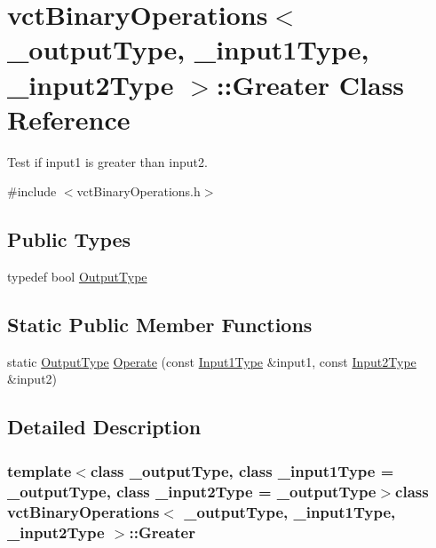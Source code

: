 \hypertarget{classvct_binary_operations_1_1_greater}{\section{vct\-Binary\-Operations$<$ \-\_\-output\-Type, \-\_\-input1\-Type, \-\_\-input2\-Type $>$\-:\-:Greater Class Reference}
\label{classvct_binary_operations_1_1_greater}
}


Test if input1 is greater than input2.  




{\ttfamily \#include $<$vct\-Binary\-Operations.\-h$>$}

\subsection*{Public Types}
\begin{DoxyCompactItemize}
\item 
typedef bool \hyperlink{classvct_binary_operations_1_1_greater_ac6bbb1b038cdd55bc5fda5b024404ebe}{Output\-Type}
\end{DoxyCompactItemize}
\subsection*{Static Public Member Functions}
\begin{DoxyCompactItemize}
\item 
static \hyperlink{classvct_binary_operations_1_1_greater_ac6bbb1b038cdd55bc5fda5b024404ebe}{Output\-Type} \hyperlink{classvct_binary_operations_1_1_greater_ab901e65f312b9e551df7b57a25e3503d}{Operate} (const \hyperlink{classvct_binary_operations_a5e56a66a012d6a28c539a08a0021c45e}{Input1\-Type} \&input1, const \hyperlink{classvct_binary_operations_a929119af557a04a16b4d854981e49e1b}{Input2\-Type} \&input2)
\end{DoxyCompactItemize}


\subsection{Detailed Description}
\subsubsection*{template$<$class \-\_\-output\-Type, class \-\_\-input1\-Type = \-\_\-output\-Type, class \-\_\-input2\-Type = \-\_\-output\-Type$>$class vct\-Binary\-Operations$<$ \-\_\-output\-Type, \-\_\-input1\-Type, \-\_\-input2\-Type $>$\-::\-Greater}

